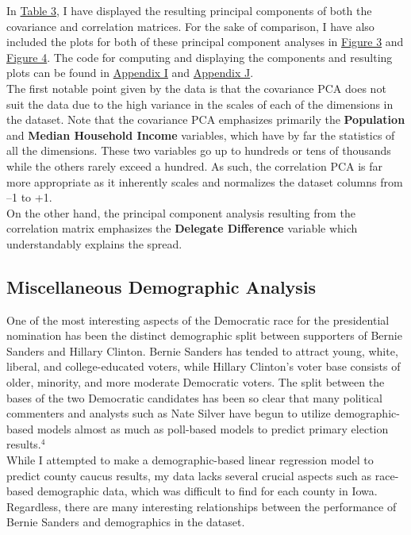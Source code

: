 \documentclass[11pt]{article}
\begin{document}
\begin{multicols}{2}

In \underline{Table 3}, I have displayed the resulting principal components of both the covariance and correlation matrices. For the sake of comparison, I have also included the plots for both of these principal component analyses in \underline{Figure 3} and \underline{Figure 4}. The code for computing and displaying the components and resulting plots can be found in \underline{Appendix I} and \underline{Appendix J}. \\

The first notable point given by the data is that the covariance PCA does not suit the data due to the high variance in the scales of each of the dimensions in the dataset. Note that the covariance PCA emphasizes primarily the \textbf{Population} and \textbf{Median Household Income} variables, which have by far the statistics of all the dimensions. These two variables go up to hundreds or tens of thousands while the others rarely exceed a hundred. As such, the correlation PCA is far more appropriate as it inherently scales and normalizes the dataset columns from --1 to +1. \\

On the other hand, the principal component analysis resulting from the correlation matrix emphasizes the \textbf{Delegate Difference} variable which understandably explains the spread. \\

\subsection{Miscellaneous Demographic Analysis}

One of the most interesting aspects of the Democratic race for the presidential nomination has been the distinct demographic split between supporters of Bernie Sanders and Hillary Clinton. Bernie Sanders has tended to attract young, white, liberal, and college-educated voters, while Hillary Clinton's voter base consists of older, minority, and more moderate Democratic voters. The split between the bases of the two Democratic candidates has been so clear that many political commenters and analysts such as Nate Silver have begun to utilize demographic-based models almost as much as poll-based models to predict primary election results.$^4$ \\

While I attempted to make a demographic-based linear regression model to predict county caucus results, my data lacks several crucial aspects such as race-based demographic data, which was difficult to find for each county in Iowa. Regardless, there are many interesting relationships between the performance of Bernie Sanders and demographics in the dataset. \\


\end{multicols}
\end{document}
